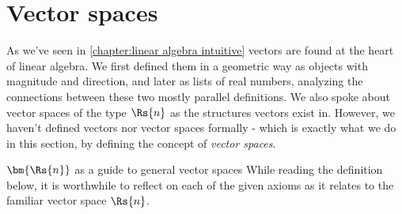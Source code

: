 \section{Vector spaces}
As we've seen in \autoref{chapter:linear algebra intuitive} vectors are found at the heart of linear algebra. We first defined them in a geometric way as objects with magnitude and direction, and later as lists of real numbers, analyzing the connections between these two mostly parallel definitions. We also spoke about vector spaces of the type $\Rs{n}$ as the structures vectors exist in. However, we haven't defined vectors nor vector spaces formally - which is exactly what we do in this section, by defining the concept of \emph{vector spaces}.

\begin{note}{$\bm{\Rs{n}}$ as a guide to general vector spaces}{}
	While reading the definition below, it is worthwhile to reflect on each of the given axioms as it relates to the familiar vector space $\Rs{n}$.
\end{note}

